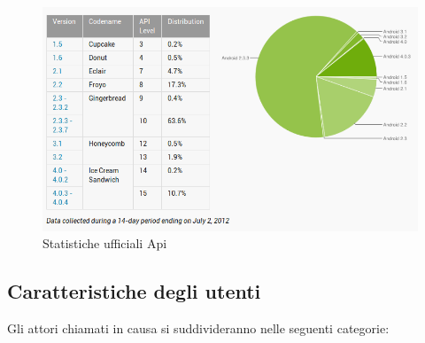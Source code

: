 \begin{figure}[H]
\centering
\caption{Statistiche ufficiali Api}
\includegraphics[scale=0.55]{images/cap1/api} 
\end{figure}



\subsection{Caratteristiche degli utenti}
Gli attori chiamati in causa si suddivideranno nelle seguenti categorie:

